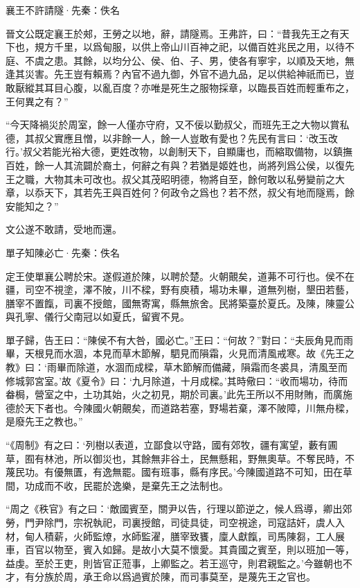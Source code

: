 \documentclass[12pt,a4paper]{ctexbook}
\begin{document}
襄王不許請隧·先秦：佚名 \par
晉文公既定襄王於郟，王勞之以地，辭，請隧焉。王弗許，曰：“昔我先王之有天下也，規方千里，以爲甸服，以供上帝山川百神之祀，以備百姓兆民之用，以待不庭、不虞之患。其餘，以均分公、侯、伯、子、男，使各有寧宇，以順及天地，無逢其災害。先王豈有賴焉？內官不過九御，外官不過九品，足以供給神祇而已，豈敢厭縱其耳目心腹，以亂百度？亦唯是死生之服物採章，以臨長百姓而輕重布之，王何異之有？”\par
“今天降禍災於周室，餘一人僅亦守府，又不佞以勤叔父，而班先王之大物以賞私德，其叔父實應且憎，以非餘一人，餘一人豈敢有愛也？先民有言曰：‘改玉改行。’叔父若能光裕大德，更姓改物，以創制天下，自顯庸也，而縮取備物，以鎮撫百姓，餘一人其流闢於裔土，何辭之有與？若猶是姬姓也，尚將列爲公侯，以復先王之職，大物其未可改也。叔父其茂昭明德，物將自至，餘何敢以私勞變前之大章，以忝天下，其若先王與百姓何？何政令之爲也？若不然，叔父有地而隧焉，餘安能知之？”\par
文公遂不敢請，受地而還。\par
單子知陳必亡·先秦：佚名 \par
定王使單襄公聘於宋。遂假道於陳，以聘於楚。火朝覿矣，道茀不可行也。侯不在疆，司空不視塗，澤不陂，川不樑，野有庾積，場功未畢，道無列樹，墾田若藝，膳宰不置餼，司裏不授館，國無寄寓，縣無旅舍。民將築臺於夏氏。及陳，陳靈公與孔寧、儀行父南冠以如夏氏，留賓不見。\par
單子歸，告王曰：“陳侯不有大咎，國必亡。”王曰：“何故？”對曰：“夫辰角見而雨畢，天根見而水涸，本見而草木節解，駟見而隕霜，火見而清風戒寒。故《先王之教》曰：‘雨畢而除道，水涸而成樑，草木節解而備藏，隕霜而冬裘具，清風至而修城郭宮室。’故《夏令》曰：‘九月除道，十月成樑。’其時儆曰：“收而場功，待而畚梮，營室之中，土功其始，火之初見，期於司裏。’此先王所以不用財賄，而廣施德於天下者也。今陳國火朝覿矣，而道路若塞，野場若棄，澤不陂障，川無舟樑，是廢先王之教也。”\par
“《周制》有之曰：‘列樹以表道，立鄙食以守路，國有郊牧，疆有寓望，藪有圃草，囿有林池，所以御災也，其餘無非谷土，民無懸耜，野無奧草。不奪民時，不蔑民功。有優無匱，有逸無罷。國有班事，縣有序民。’今陳國道路不可知，田在草間，功成而不收，民罷於逸樂，是棄先王之法制也。\par
“周之《秩官》有之曰：‘敵國賓至，關尹以告，行理以節逆之，候人爲導，卿出郊勞，門尹除門，宗祝執祀，司裏授館，司徒具徒，司空視途，司寇詰奸，虞人入材，甸人積薪，火師監燎，水師監濯，膳宰致饔，廩人獻餼，司馬陳芻，工人展車，百官以物至，賓入如歸。是故小大莫不懷愛。其貴國之賓至，則以班加一等，益虔。至於王吏，則皆官正蒞事，上卿監之。若王巡守，則君親監之。’今雖朝也不才，有分族於周，承王命以爲過賓於陳，而司事莫至，是蔑先王之官也。\par
\end{document}
